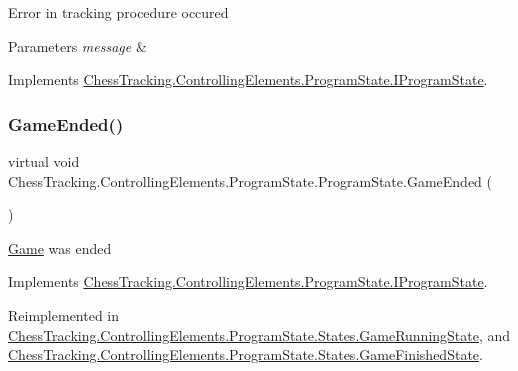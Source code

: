 Error in tracking procedure occured 


\begin{DoxyParams}{Parameters}
{\em message} & \\
\hline
\end{DoxyParams}


Implements \mbox{\hyperlink{interface_chess_tracking_1_1_controlling_elements_1_1_program_state_1_1_i_program_state_aefc4990cd4c48560aa7d6b857476bd56}{Chess\+Tracking.\+Controlling\+Elements.\+Program\+State.\+I\+Program\+State}}.

\mbox{\label{class_chess_tracking_1_1_controlling_elements_1_1_program_state_1_1_program_state_a7ff7676272d3449e524a11eb73201e30}} 
\subsubsection{\texorpdfstring{GameEnded()}{GameEnded()}}
{\footnotesize\ttfamily virtual void Chess\+Tracking.\+Controlling\+Elements.\+Program\+State.\+Program\+State.\+Game\+Ended (\begin{DoxyParamCaption}{ }\end{DoxyParamCaption})\hspace{0.3cm}{\ttfamily [virtual]}}



\mbox{\hyperlink{namespace_chess_tracking_1_1_game}{Game}} was ended 



Implements \mbox{\hyperlink{interface_chess_tracking_1_1_controlling_elements_1_1_program_state_1_1_i_program_state_afb709d1cfd4782712e5e23e54fc3ad28}{Chess\+Tracking.\+Controlling\+Elements.\+Program\+State.\+I\+Program\+State}}.



Reimplemented in \mbox{\hyperlink{class_chess_tracking_1_1_controlling_elements_1_1_program_state_1_1_states_1_1_game_running_state_a716f8029e51162d10d89e1a81c97bb32}{Chess\+Tracking.\+Controlling\+Elements.\+Program\+State.\+States.\+Game\+Running\+State}}, and \mbox{\hyperlink{class_chess_tracking_1_1_controlling_elements_1_1_program_state_1_1_states_1_1_game_finished_state_a13eabd72515fdbb1fc9b0026ff7800a7}{Chess\+Tracking.\+Controlling\+Elements.\+Program\+State.\+States.\+Game\+Finished\+State}}.

